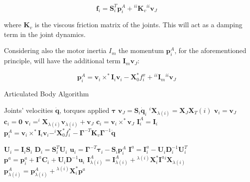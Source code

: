 $$
\mathbf{f} _i = \mathbf{S} ^T _i \mathbf{p} ^A _i + {} ^{ii} \mathbf{K} _v {} ^{ii}\mathbf{v} _J
$$

where $\mathbf{K} _v$ is the viscous friction matrix of the joints. This will act as a damping term in the joint dynamics.

Considering also the motor inertia $I _m$ the momentum $\mathbf{p} ^A _i$, for the aforementioned principle, will have the additional term $\mathbf{I} _m \mathbf{v} _J$:

$$
\mathbf{p} ^A _i = \mathbf{v} _i \times ^* \mathbf{I} _i \mathbf{v} _i - \mathbf{X} ^* _0 f ^x _i + {} ^{ii}\mathbf{I} _m {} ^{ii}\mathbf{v} _J
$$


\begin{algorithm}[H]
    \caption{Articulated Body Algorithm}
    \label{alg:aba}
    \begin{algorithmic}[1]
    \REQUIRE Joints' velocities $\dot{\mathbf{q}}$, torques applied $\boldsymbol{\tau}$
        \STATE $\mathrm{\mathbf{v}}_J = \mathbf{S}_i \dot{\mathbf{q}}_i$
        \STATE $^i\mathbf{X}_{\lambda(i)} = \mathbf{X}_J\mathbf{X}_T (i)$
                \STATE $\mathrm{\mathbf{v}}_i = \mathrm{\mathbf{v}}_J$
                \STATE $\mathbf{c}_i = \mathbf{0}$
            \ELSE
                \STATE $\mathrm{\mathbf{v}}_i = ^i\mathbf{X} _{\lambda(i)}\mathrm{\mathbf{v}}_{\lambda(i)} + \mathrm{\mathbf{v}}_J$
                \STATE $\mathbf{c}_i = \mathrm{\mathbf{v}}_i \times ^* \mathrm{\mathbf{v}}_J$
            \ENDIF
        \STATE $\mathbf{I}_i ^A = \mathbf{I}_i$
        \STATE $\mathbf{p}_i ^A = \mathrm{\mathbf{v}}_i \times^* \mathbf{I}_i\mathrm{\mathbf{v}}_i - ^i\mathbf{X} _0 ^* f ^* _i - \boldsymbol{\Gamma} ^{-T}\mathbf{K}_v \boldsymbol{\Gamma} ^{-1} \mathbf{\dot{q}}$
    \ENDFOR 
    
        \STATE $\mathbf{U}_i = \mathbf{I}_i \mathbf{S}_i$
        \STATE $\mathbf{D}_i = \mathbf{S}_i ^T \mathbf{U}_i$
        \STATE $\mathbf{u}_i = \boldsymbol{\Gamma}^{-T}\boldsymbol{\tau}_i - \mathbf{S}_i\mathbf{p}_i^A$
                \STATE $\mathbf{I}^a = \mathbf{I}^a_i - \mathbf{U}_i\mathbf{D}_i ^{-1}\mathbf{U}_i ^T$
                \STATE $\mathbf{p}^a = \mathbf{p}^a_i + \mathbf{I}^a\mathbf{C}_i + \mathbf{U}_i\mathbf{D}^{-1}\mathbf{u}_i$
                \STATE $\mathbf{I}^A_{\lambda(i)} = \mathbf{I}^A_{\lambda(i)} + {}^{\lambda(i)}\mathbf{X}_i^* \mathbf{I}^a {}^i\mathbf{X}_{\lambda(i)}$
                \STATE $\mathbf{p}^A_{\lambda(i)} = \mathbf{p}^A_{\lambda(i)} + {}^{\lambda(i)}\mathbf{X}_i^*\mathbf{p}^a$
            \ENDIF
    \ENDFOR
    

\end{algorithmic}
\end{algorithm}
